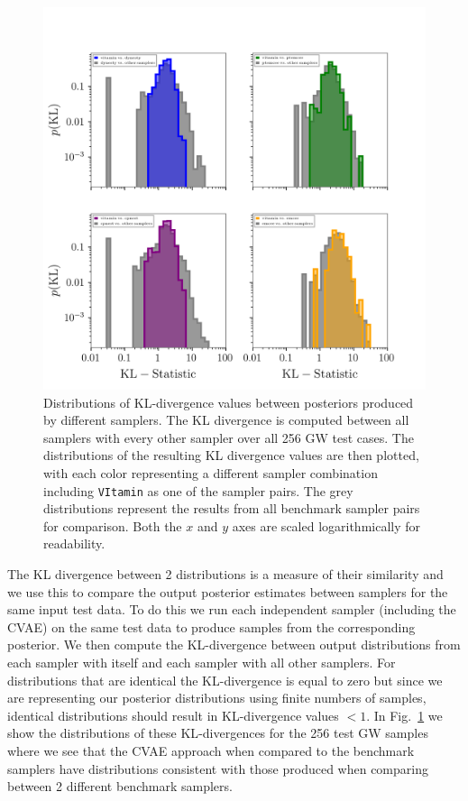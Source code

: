 \documentclass[%
showpacs,
 amsmath,amssymb,
 aps,
 twocolumn,
 prl,
 reprint,
floatfix,
]{revtex4-1}
\begin{document}
%
\begin{figure}
    \includegraphics[width=\textwidth]{hist-kl.png}
    \caption{\label{fig:kl_results} Distributions of \ac{KL}-divergence values
between posteriors produced by different samplers. The \ac{KL} divergence is
computed between all samplers with every other sampler over all 256 \ac{GW}
test cases. The distributions of the resulting \ac{KL} divergence values are
then plotted, with each color representing a different sampler combination
including \texttt{VItamin} as one of the sampler pairs. The grey distributions
represent the results from all benchmark sampler pairs for comparison. Both the
$x$ and $y$ axes are scaled logarithmically for readability.}
\end{figure}
%

%
%
The \ac{KL} divergence between 2 distributions is a measure of their similarity
and we use this to compare the output posterior estimates between samplers for
the same input test data. To do this we run each independent sampler (including
the \ac{CVAE}) on the same test data to produce samples from the corresponding
posterior. We then compute the \ac{KL}-divergence between output distributions
from each sampler with itself and each sampler with all other samplers. For
distributions that are identical the \ac{KL}-divergence is equal to zero but
since we are representing our posterior distributions using finite numbers of
samples, identical distributions should result in KL-divergence values $<1$. In
Fig.~\ref{fig:kl_results} we show the distributions of these
\ac{KL}-divergences for the 256 test \ac{GW} samples where we see that the
\ac{CVAE} approach when compared to the benchmark samplers have distributions
consistent with those produced when comparing between 2 different benchmark
samplers.


\end{document}
